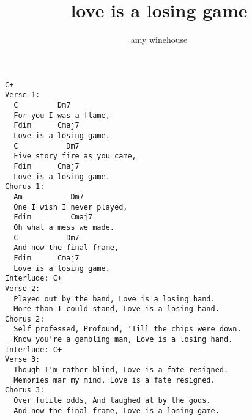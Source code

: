 \author{amy winehouse}
\title{love is a losing game}
\maketitle
\begin{verbatim}
C+
Verse 1:
  C         Dm7
  For you I was a flame,
  Fdim      Cmaj7
  Love is a losing game.
  C	          Dm7
  Five story fire as you came,
  Fdim      Cmaj7
  Love is a losing game.
Chorus 1:
  Am           Dm7
  One I wish I never played,
  Fdim         Cmaj7
  Oh what a mess we made.
  C           Dm7
  And now the final frame,
  Fdim      Cmaj7
  Love is a losing game.
Interlude: C+
Verse 2:
  Played out by the band, Love is a losing hand.
  More than I could stand, Love is a losing hand.
Chorus 2:
  Self professed, Profound, 'Till the chips were down.
  Know you're a gambling man, Love is a losing hand.
Interlude: C+
Verse 3:
  Though I'm rather blind, Love is a fate resigned.
  Memories mar my mind, Love is a fate resigned.
Chorus 3:
  Over futile odds, And laughed at by the gods.
  And now the final frame, Love is a losing game.
\end{verbatim}
